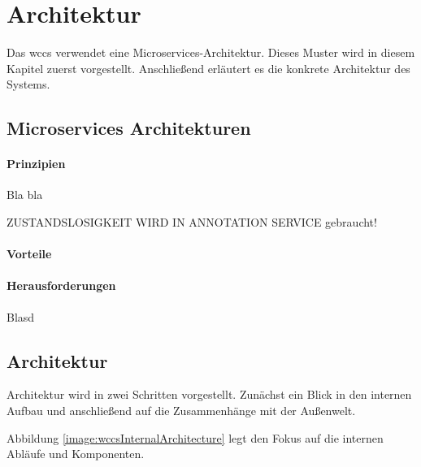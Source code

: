 \section{Architektur}
    \label{section:Architecture}
    Das \gls{wccs} verwendet eine Microservices-Architektur.
    Dieses Muster wird in diesem Kapitel zuerst vorgestellt.
    Anschließend erläutert es die konkrete Architektur des Systems.

    \subsection{Microservices Architekturen}
        \label{section:conceptMicroServices}
        \paragraph{Prinzipien}
            Bla bla \cite{newman:microservices}

            ZUSTANDSLOSIGKEIT WIRD IN ANNOTATION SERVICE gebraucht!
        \paragraph{Vorteile}
        \paragraph{Herausforderungen}
            Blasd \cite{wolff:microservices}

    \subsection{Architektur}
        Architektur wird in zwei Schritten vorgestellt.
        Zunächst ein Blick in den internen Aufbau und anschließend auf die Zusammenhänge mit der Außenwelt.
        
        Abbildung \ref{image:wccsInternalArchitecture} legt den Fokus auf die
        internen Abläufe und Komponenten.

